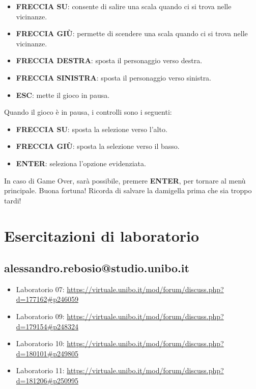 \documentclass[a4paper,12pt]{report}
\begin{document}
\begin{itemize}
    \item \textbf{FRECCIA SU}: consente di salire una scala quando ci si trova nelle vicinanze.
    \item \textbf{FRECCIA GIÙ}: permette di scendere una scala quando ci si trova nelle vicinanze.
    \item \textbf{FRECCIA DESTRA}: sposta il personaggio verso destra.
    \item \textbf{FRECCIA SINISTRA}: sposta il personaggio verso sinistra.
    \item \textbf{ESC}: mette il gioco in pausa.
\end{itemize}
%
Quando il gioco è in pausa, i controlli sono i seguenti:

\begin{itemize}
    \item \textbf{FRECCIA SU}: sposta la selezione verso l'alto.
    \item \textbf{FRECCIA GIÙ}: sposta la selezione verso il basso.
    \item \textbf{ENTER}: seleziona l'opzione evidenziata.
\end{itemize}
%
In caso di Game Over, sarà possibile, premere \textbf{ENTER}, per tornare al menù principale. 
Buona fortuna! Ricorda di salvare la damigella prima che sia troppo tardi!

\chapter{Esercitazioni di laboratorio}

\section{alessandro.rebosio@studio.unibo.it}

\begin{itemize}
 	\item Laboratorio 07: \url{https://virtuale.unibo.it/mod/forum/discuss.php?d=177162#p246059}
	\item Laboratorio 09: \url{https://virtuale.unibo.it/mod/forum/discuss.php?d=179154#p248324}
	\item Laboratorio 10: \url{https://virtuale.unibo.it/mod/forum/discuss.php?d=180101#p249805}
	\item Laboratorio 11: \url{https://virtuale.unibo.it/mod/forum/discuss.php?d=181206#p250995}
\end{itemize}


\end{document}
